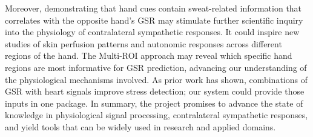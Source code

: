     Moreover, demonstrating that hand cues contain sweat-related information that correlates with the opposite hand's GSR may stimulate further scientific inquiry into the physiology of contralateral sympathetic responses. It could inspire new studies of skin perfusion patterns and autonomic responses across different regions of the hand. The Multi-ROI approach may reveal which specific hand regions are most informative for GSR prediction, advancing our understanding of the physiological mechanisms involved. As prior work has shown, combinations of GSR with heart signals improve stress detection; our system could provide those inputs in one package. In summary, the project promises to advance the state of knowledge in physiological signal processing, contralateral sympathetic responses, and yield tools that can be widely used in research and applied domains.


